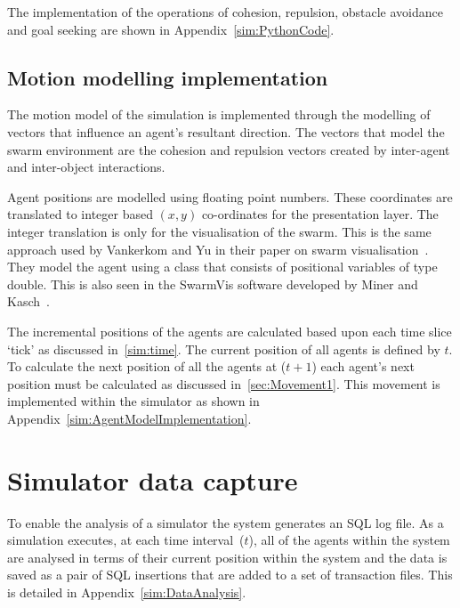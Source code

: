 The implementation of the operations of cohesion, repulsion, obstacle avoidance and goal seeking are shown in Appendix~\ref{sim:PythonCode}.

\subsection{Motion modelling implementation}
The motion model of the simulation is implemented through the modelling of vectors that influence an agent's resultant direction. The vectors that model the swarm environment are the cohesion and repulsion vectors created by inter-agent and inter-object interactions. 

Agent positions are modelled using floating point numbers. These coordinates are translated to integer based $(x,y)$ co-ordinates for the presentation layer. The integer translation is only for the visualisation of the swarm. This is the same approach used by Vankerkom and Yu in their paper on swarm visualisation~\cite{VY:04}. They model the agent using a class that consists of positional variables of type double. This is also seen in the SwarmVis software developed by Miner and Kasch~\cite{DMNK:ND}.

The incremental positions of the agents are calculated based upon each time slice `tick' as discussed in~\autoref{sim:time}. The current position of all agents is defined by $t$. To calculate the next position of all the agents at ($t+1$) each agent's next position must be calculated as discussed in~\autoref{sec:Movement1}. This movement is implemented within the simulator as shown in Appendix~\ref{sim:AgentModelImplementation}.

\section{Simulator data capture}
To enable the analysis of a simulator the system generates an SQL log file. As a simulation executes, at each time interval~($t$), all of the agents within the system are analysed in terms of their current position within the system and the data is saved as a pair of SQL insertions that are added to a set of transaction files. This is detailed in Appendix~\ref{sim:DataAnalysis}.

